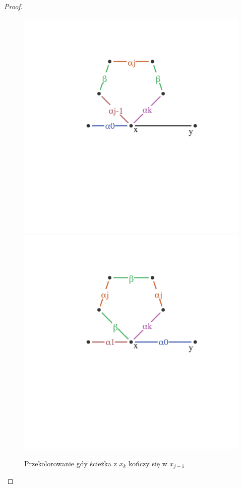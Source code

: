 \begin{proof}
\begin{enumerate}
		      \begin{figure}[H]
			      \centering
			      \includegraphics[scale=0.45]{images/vizing/fan_case_three_before.png}
			      \includegraphics[scale=0.45]{images/vizing/fan_case_three_after.png}
			      \caption{Przekolorowanie gdy ścieżka z $x_k$ kończy się w $x_{j-1}$}
		      \end{figure}


\end{enumerate}
\end{proof}
